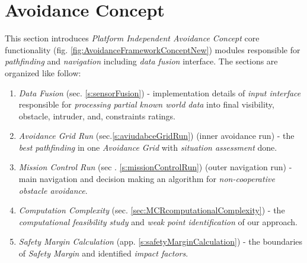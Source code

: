 \cleardoublepage
\section{Avoidance Concept}\label{s:avoidanceConcept}
\noindent This section introduces \emph{Platform Independent Avoidance Concept} core functionality (fig. \ref{fig:AvoidanceFrameworkConceptNew}) modules responsible for \emph{pathfinding} and \emph{navigation} including \emph{data fusion} interface. The sections are organized like follow:

\begin{enumerate}
    \item \emph{Data Fusion} (sec. \ref{s:sensorFusion}) - implementation details of \emph{input interface} responsible for \emph{processing partial known world data} into final visibility, obstacle, intruder, and, constraints ratings.
    
    \item \emph{Avoidance Grid Run} (sec.\ref{s:aviudabceGridRun}) (inner avoidance run) - the \emph{best pathfinding} in one \emph{Avoidance Grid} with \emph{situation assessment} done.
    
    \item \emph{Mission Control Run} (sec . \ref{s:missionControlRun}) (outer navigation run) - main navigation and decision making an algorithm for \emph{non-cooperative obstacle avoidance}.
    
    \item \emph{Computation Complexity} (sec. \ref{sec:MCRcomputationalComplexity}) - the \emph{computational feasibility study} and \emph{weak point identification} of our approach.
    
    \item \emph{Safety Margin Calculation} (app. \ref{s:safetyMarginCalculation}) - the boundaries of \emph{Safety Margin} and identified \emph{impact factors}.
\end{enumerate}
